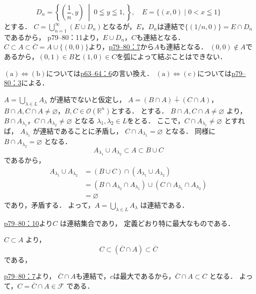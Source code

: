 \begin{tanswer}
    \[
        D_n = \left\{(\frac{1}{n},y)\; \middle| \; 0\leqq y\leqq 1,\right\}, \quad E=\{(x,0)\mid 0<x\leqq 1\}
    \]
    とする．
    $C=\bigcup_{n=1}^{\infty}\left(E\cup D_n\right)$となるが，$E$，$D_n$は連結で$\{ (1/n,0) \}= E \cap D_n$であるから，
    p79--80：11より，$E\cup D_n$，$C$も連結となる．
    $C\subset A\subset \overline{C}=A\cup\{(0,0)\}$より，\hyperref[p79--80：7]{p79--80：7}から$A$も連結となる．
    $(0,0)\notin A$であるから，$(0,1)\in B$と$(1,0)\in C$を弧によって結ぶことはできない．
\end{tanswer}

\begin{tproof}
    $(\text{a})\iff (\text{b})$については\hyperref[p63--64：6]{p63--64：6}の言い換え．
    $(\text{a})\iff  (\text{c})$については\hyperref[p79--80：3]{p79--80：3}による．
\end{tproof}


\begin{tproof}
    $A = \bigcup_{\lambda \in L} A_\lambda$ が連結でないと仮定し，
    $A =(B \cap A)\dotplus(C \cap A)$，$B \cap A ,C \cap A \neq \varnothing$，$B, C \in \mathcal{O}(\mathbb{R}^n)$とする．
    とする．
    $ B \cap A ,C \cap A \neq \varnothing$ より，$B \cap A_{\lambda_1}$，$C \cap A_{\lambda_2} \neq \varnothing$
    となる $\lambda_1,\lambda_2 \in L$をとる．
    ここで，$C \cap A_{\lambda_1} \neq \varnothing$ とすれば，
    $A_{\lambda_1}$ が連結であることに矛盾し，
    $C \cap A_{\lambda_1} = \varnothing$ となる．
    同様に $B \cap A_{\lambda_2} = \varnothing$ となる．
    \[
        A_{\lambda_1} \cup A_{\lambda_2} \subset  A \subset B \cup C
    \]
    であるから，
    \begin{align*}
        A_{\lambda_1} \cup A_{\lambda_2} & =( B \cup C) \cap (A_{\lambda_1} \cup A_{\lambda_2})                                      \\
                                         & =(B \cap A_{\lambda_2} \cap A_{\lambda_1}) \cup (C \cap A_{\lambda_1} \cap A_{\lambda_2}) \\
                                         & =\varnothing
    \end{align*}
    であり，矛盾する．
    よって，$A = \bigcup_{\lambda \in L} A_\lambda$ は連結である．
\end{tproof}


\begin{tproof}
    \hyperref[p79--80：10]{p79--80：10}より$C$ は連結集合であり，
    定義どおり特に最大なものである．

    $C \subset A$ より，
    \[
        C \subset (\overline{C} \cap A) \subset \overline{C}
    \]
    である，

    \hyperref[p79--80：7]{p79--80：7}より，
    $\overline{C} \cap A$も連結で，$c$は最大であるから，$\overline{C} \cap A \subset C$ となる．
    よって，$ C = \overline{C} \cap A \in \mathcal{F}$ である．
\end{tproof}

